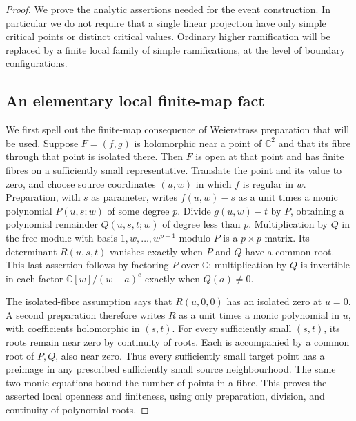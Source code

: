 \documentclass[11pt,a4paper]{article}
\theoremstyle{remark}
\begin{document}
\begin{proof}

We prove the analytic assertions needed for the event construction.  In
particular we do not require that a single linear projection have only
simple critical points or distinct critical values.  Ordinary higher
ramification will be replaced by a finite local family of simple
ramifications, at the level of boundary configurations.

\subsection{An elementary local finite-map fact}

We first spell out the finite-map consequence of Weierstrass preparation
that will be used.  Suppose $F=(f,g)$ is holomorphic near a point of
$\mathbb C^2$ and that its fibre through that point is isolated there.
Then $F$ is open at that point and has finite fibres on a sufficiently
small representative.  Translate the point and its value to zero, and
choose source coordinates $(u,w)$ in which $f$ is regular in $w$.
Preparation, with $s$ as parameter, writes $f(u,w)-s$ as a unit times a
monic polynomial $P(u,s;w)$ of some degree $p$.  Divide $g(u,w)-t$ by
$P$, obtaining a polynomial remainder $Q(u,s,t;w)$ of degree less than
$p$.  Multiplication by $Q$ in the free module with basis
$1,w,\ldots,w^{p-1}$ modulo $P$ is a $p\times p$ matrix.  Its determinant
$R(u,s,t)$ vanishes exactly when $P$ and $Q$ have a common root.  This
last assertion follows by factoring $P$ over $\mathbb C$: multiplication
by $Q$ is invertible in each factor $\mathbb C[w]/(w-a)^e$ exactly when
$Q(a)\ne0$.

The isolated-fibre assumption says that $R(u,0,0)$ has an isolated zero
at $u=0$.  A second preparation therefore writes $R$ as a unit times a
monic polynomial in $u$, with coefficients holomorphic in $(s,t)$.
For every sufficiently small $(s,t)$, its roots remain near zero by
continuity of roots.  Each is accompanied by a common root of $P,Q$,
also near zero.  Thus every sufficiently small target point has a
preimage in any prescribed sufficiently small source neighbourhood.
The same two monic equations bound the number of points in a fibre.
This proves the asserted local openness and finiteness, using only
preparation, division, and continuity of polynomial roots.


\end{proof}
\end{document}
